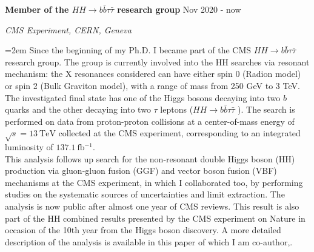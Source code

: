 \documentclass[paper=a4,fontsize=12pt]{article} %
\newcommand{\hhbbtt}{$ HH \rightarrow b\bar{b}\tau\bar{\tau}$ }
\newcommand{\sepspace}{\vspace*{1em}}		%
\newcommand{\EducationEntry}[4]{
	\noindent \textbf{#1} \hfill      %
	{#2} \par  %
	\noindent \textit{#3} \par        %
	\noindent\hangindent=2em\hangafter=0 \small #4 %
	\normalsize \par}
\begin{document}
    \EducationEntry{Member of the \hhbbtt \;research group}{Nov 2020 - now}{CMS Experiment, CERN, Geneva}{Since the beginning of my Ph.D. I became part of the CMS \hhbbtt \, research group. The group is currently involved into the HH searches via resonant mechanism: the X resonances considered can have either spin 0 (Radion model) or spin 2 (Bulk Graviton model), with a range of mass from 250 GeV to 3 TeV. The investigated final state has one of the Higgs bosons decaying into two $b$ quarks and the other decaying into two $\tau$ leptons (\hhbbtt). The search is performed on data from proton-proton collisions at a center-of-mass energy of $\sqrt{s} = \SI{13}{\tera \electronvolt}$ collected at the CMS experiment, corresponding to an integrated luminosity of $\SI{137.1}{\femto\barn ^{-1}}$. \\
    This analysis follows up search for the non-resonant double Higgs boson (HH) production via gluon-gluon fusion (GGF) and vector boson fusion (VBF) mechanisms at the CMS experiment, in which I collaborated too, by performing studies on the systematic sources of uncertainties and limit extraction. The analysis is now public after almost one year of CMS reviews. This result is also part of the HH combined results presented by the CMS experiment on Nature in occasion of the 10th year from the Higgs boson discovery. A more detailed description of the analysis is available in this paper of which I am co-author,\;\cite{bbttananote}.} 
    \sepspace
\end{document}
